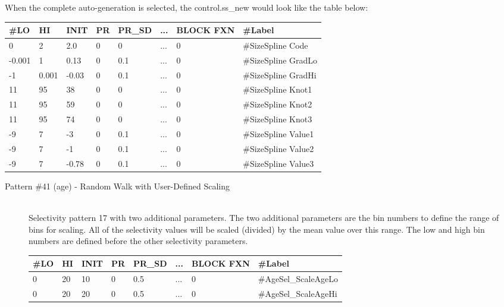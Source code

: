 \begin{description}
	When the complete auto-generation is selected, the control.ss\_new would look like the table below:
	
	\begin{center}
		\begin{longtable}{p{0.8cm} p{0.8cm} p{1cm} p{0.8cm} p{1.75cm}p{1cm} p{1.2cm} p{5.2cm}}
			\hline
			\#LO & HI & INIT & PR & PR\_SD & ... & BLOCK FXN & \#Label \\
			\hline
			0      &     2 &   2.0 & 0 & 0   & ... & 0 & \#SizeSpline Code\\
			-0.001 & 	 1 &  0.13 & 0 & 0.1 & ... & 0 & \#SizeSpline GradLo\\
			-1     & 0.001 & -0.03 & 0 & 0.1 & ... & 0 & \#SizeSpline GradHi\\
			11     & 	95 & 	38 & 0 & 0   & ... & 0 & \#SizeSpline Knot1\\
			11     & 	95 & 	59 & 0 & 0   & ... & 0 & \#SizeSpline Knot2\\
			11     & 	95 & 	74 & 0 & 0   & ... & 0 & \#SizeSpline Knot3\\
			-9     & 	 7 & 	-3 & 0 & 0.1 & ... & 0 & \#SizeSpline Value1\\
			-9     &   	 7 & 	-1 & 0 & 0.1 & ... & 0 & \#SizeSpline Value2\\
			-9     & 	 7 & -0.78 & 0 & 0.1 & ... & 0 & \#SizeSpline Value3\\
			\hline
		\end{longtable}
	\end{center}
\end{description}

\begin{description}
	\item[Pattern \#41 (age) - Random Walk with User-Defined Scaling]\hfil\\
	Selectivity pattern 17 with two additional parameters. The two additional parameters are the bin numbers to define the range of bins for scaling. All of the selectivity values will be scaled (divided) by the mean value over this range. The low and high bin numbers are defined before the other selectivity parameters.

	\begin{center}
		\begin{longtable}{p{0.8cm} p{0.8cm} p{1cm} p{0.8cm} p{1.75cm}p{1cm} p{1.2cm} p{5.2cm}}
			\hline
			\#LO & HI & INIT & PR & PR\_SD & ... & BLOCK FXN & \#Label \\
			\hline
			0 & 20 & 10 & 0 & 0.5 & ... & 0 & \#AgeSel\_ScaleAgeLo \\
			0 & 20 & 20 & 0 & 0.5 & ... & 0 & \#AgeSel\_ScaleAgeHi \\
			\hline
		\end{longtable}
	\end{center}
\end{description}

